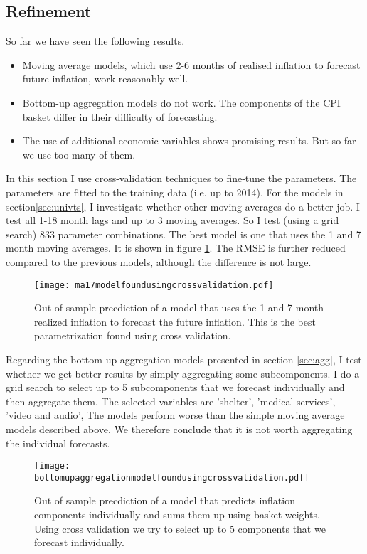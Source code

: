 \documentclass[12pt]{article}
\begin{document}
\subsection{Refinement}
\label{sec:Refinement}

So far we have seen the following results. 
\begin{itemize}
\item Moving average models, which use 2-6 months of realised inflation to forecast future inflation, work reasonably well.
\item Bottom-up aggregation models do not work. The components of the CPI basket differ in their difficulty of forecasting.
\item The use of additional economic variables shows promising results. But so far we use too many of them.
\end{itemize}

In this section I use cross-validation techniques to fine-tune the parameters. The parameters are fitted to the training data (i.e. up to 2014).
For the models in section\ref{sec:univts}, I investigate whether other moving averages do a better job. I test all 1-18 month lags and up to 3 moving averages. So I test (using a grid search) 833 parameter combinations. The best model is one that uses the 1 and 7 month moving averages. It is shown in figure \ref{fig:ma17modelfoundusingcrossvalidation}. The RMSE is further reduced compared to the previous models, although the difference is not large.
\begin{figure}[h]
    \centering
    \texttt{[image: ma17modelfoundusingcrossvalidation.pdf]}
    \caption{Out of sample precdiction of a model that uses the 1 and 7 month realized inflation to forecast the future inflation. This is the best parametrization found using cross validation.}
    \label{fig:ma17modelfoundusingcrossvalidation}
\end{figure}


Regarding the bottom-up aggregation models presented in section \ref{sec:agg}, I test whether we get better results by simply aggregating some subcomponents. I do a grid search to select up to 5 subcomponents that we forecast individually and then aggregate them. The selected variables are 'shelter', 'medical services', 'video and audio',
  The models perform worse than the simple moving average models described above. We therefore conclude that it is not worth aggregating the individual forecasts.
\begin{figure}[h]
    \centering
    \texttt{[image: bottomupaggregationmodelfoundusingcrossvalidation.pdf]}
    \caption{Out of sample precdiction of a model that predicts inflation components individually and sums them up using basket weights. Using cross validation we try to select up to 5 components that we forecast individually. }
    \label{fig:bottomupaggregationmodelfoundusingcrossvalidation}
\end{figure}
\end{document}
